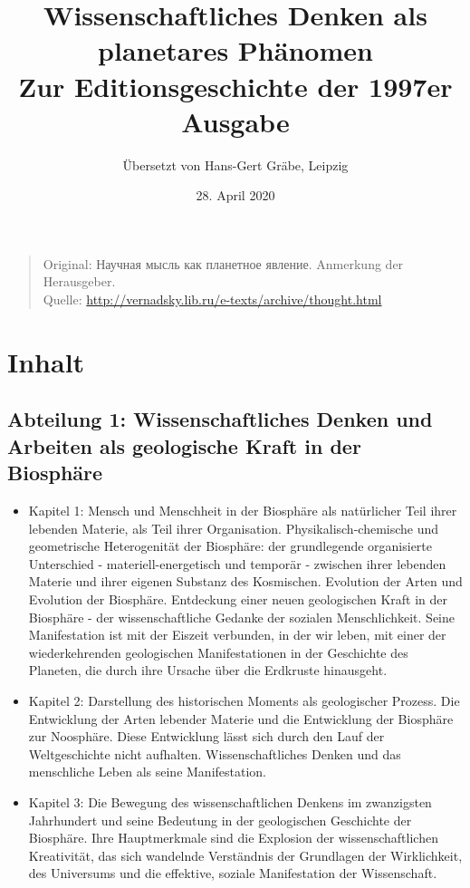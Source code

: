 \documentclass[11pt,a4paper]{article}
\title{Wissenschaftliches Denken als planetares Phänomen\\ Zur
  Editionsgeschichte der 1997er Ausgabe}
\author{Übersetzt von Hans-Gert Gräbe, Leipzig}
\date{28. April 2020}
\begin{document}
\maketitle
\begin{quote}
  Original: \foreignlanguage{russian}{Научная мысль как планетное явление}.
  Anmerkung der Herausgeber.\\
  Quelle: \url{http://vernadsky.lib.ru/e-texts/archive/thought.html}
\end{quote}

\section{Inhalt} 

\subsection*{Abteilung 1: Wissenschaftliches Denken und Arbeiten als
  geologische Kraft in der Biosphäre}
\begin{itemize}
\item Kapitel 1: Mensch und Menschheit in der Biosphäre als natürlicher Teil
  ihrer lebenden Materie, als Teil ihrer Organisation. Physikalisch-chemische
  und geometrische Heterogenität der Biosphäre: der grundlegende organisierte
  Unterschied - materiell-energetisch und temporär - zwischen ihrer lebenden
  Materie und ihrer eigenen Substanz des Kosmischen. Evolution der Arten und
  Evolution der Biosphäre. Entdeckung einer neuen geologischen Kraft in der
  Biosphäre - der wissenschaftliche Gedanke der sozialen Menschlichkeit. Seine
  Manifestation ist mit der Eiszeit verbunden, in der wir leben, mit einer der
  wiederkehrenden geologischen Manifestationen in der Geschichte des Planeten,
  die durch ihre Ursache über die Erdkruste hinausgeht.

\item Kapitel 2: Darstellung des historischen Moments als geologischer
  Prozess. Die Entwicklung der Arten lebender Materie und die Entwicklung der
  Biosphäre zur Noosphäre. Diese Entwicklung lässt sich durch den Lauf der
  Weltgeschichte nicht aufhalten. Wissenschaftliches Denken und das
  menschliche Leben als seine Manifestation.

\item Kapitel 3: Die Bewegung des wissenschaftlichen Denkens im zwanzigsten
  Jahrhundert und seine Bedeutung in der geologischen Geschichte der
  Biosphäre. Ihre Hauptmerkmale sind die Explosion der wissenschaftlichen
  Kreativität, das sich wandelnde Verständnis der Grundlagen der Wirklichkeit,
  des Universums und die effektive, soziale Manifestation der Wissenschaft.
\end{itemize}
\end{document}
